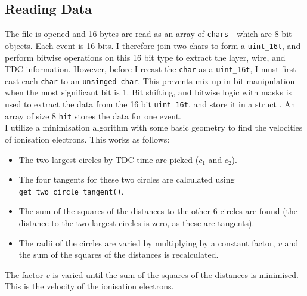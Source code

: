 \documentclass[11pt]{article}
\begin{document}
\subsection{Reading Data}
\label{sec:reading}
The file is opened and 16 bytes are read as an array of \texttt{chars} - which are 8 bit objects. Each event is 16 bits. I therefore join two chars to form a \texttt{uint\_16t}, and perform bitwise operations on this 16 bit type to extract the layer, wire, and TDC information. However, before I recast the \texttt{char} as a \texttt{uint\_16t}, I must first cast each \texttt{char} to an \texttt{unsinged char}. This prevents mix up in bit manipulation when the most significant bit is 1. Bit shifting, and bitwise logic with masks is used to extract the data from the 16 bit \texttt{uint\_16t}, and store it in a struct . An array of size 8 \texttt{hit} stores the data for one event.\\


I utilize a minimisation algorithm with some basic geometry to find the velocities of ionisation electrons. This works as follows:
\begin{itemize}
    \item The two largest circles by TDC time are picked ($c_1$ and $c_2$).
    \item The four tangents for these two circles are calculated using \texttt{get\_two\_circle\_tangent()}.
    \item The sum of the squares of the distances to the other 6 circles are found (the distance to the two largest circles is zero, as these are tangents).
    \item The radii of the circles are varied by multiplying by a constant factor, $v$ and the sum of the squares of the distances is recalculated.
\end{itemize}
The factor $v$ is varied until the sum of the squares of the distances is minimised. This is the velocity of the ionisation electrons.
\end{document}
